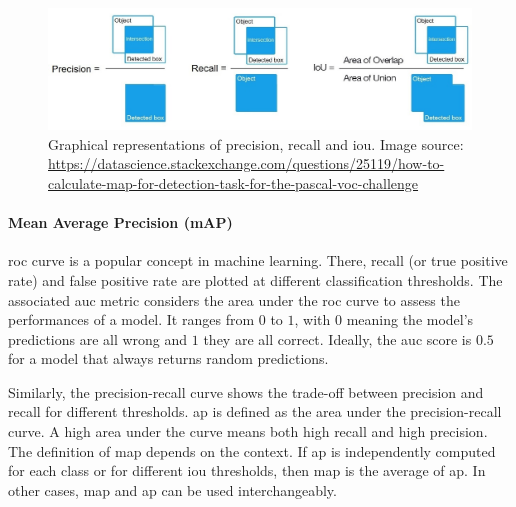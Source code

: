 \documentclass[%
    corpo=12pt,
    twoside,
    stile=classica,   
    tipotesi=magistrale,
    evenboxes,
    english,
	numerazioneromana,
]{toptesi}
\begin{document}
\begin{figure}[t]
	\centering
	\includegraphics[width=\linewidth]{imgs/precision_recall_iou.jpg}
	\caption[Graphical representations of precision, recall and \gls{iou}]{Graphical representations of precision, recall and \gls{iou}. Image source: \url{https://datascience.stackexchange.com/questions/25119/how-to-calculate-map-for-detection-task-for-the-pascal-voc-challenge}}
	\label{fig:iou}
\end{figure}

\paragraph{Mean Average Precision (mAP)}
\gls{roc} curve is a popular concept in machine learning. There, recall (or true positive rate) and false positive rate are plotted at different classification thresholds. The associated \gls{auc} metric considers the area under the \gls{roc} curve to assess the performances of a model\cite{roc}. It ranges from $ 0 $ to $ 1 $, with $ 0 $ meaning the model's predictions are all wrong and $ 1 $ they are all correct. Ideally, the \gls{auc} score is $ 0.5 $ for a model that always returns random predictions.

Similarly, the precision-recall curve shows the trade-off between precision and recall for different thresholds\cite{precrecall}. \gls{ap} is defined as the area under the precision-recall curve. A high area under the curve means both high recall and high precision. The definition of \gls{map} depends on the context. If \gls{ap} is independently computed for each class or for different \gls{iou} thresholds, then \gls{map} is the average of \gls{ap}. In other cases, \gls{map} and \gls{ap} can be used interchangeably.
\end{document}
